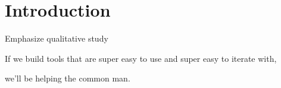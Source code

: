 \section{Introduction}
Emphasize qualitative study

If we build tools that are super easy to use and super easy to iterate with, 

we’ll be helping the common man.
